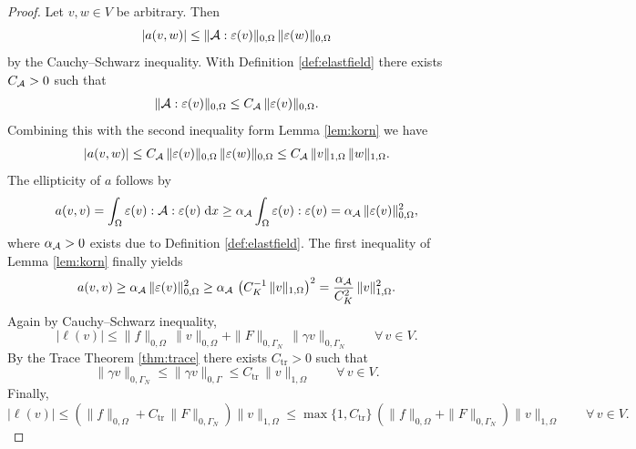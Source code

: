 \begin{proof}
	Let $v,w\in V$ be arbitrary. Then
	\begin{equation*}
		|a(v,w)|\le \|{\mathcal A}:\varepsilon(v)\|_{0,\Omega}\,\|\varepsilon(w)\|_{0,\Omega}
	\end{equation*}
	by the Cauchy--Schwarz inequality. With Definition \ref{def:elastfield} there exists $C_{\mathcal A}>0$ such that
	\begin{equation*}
		\|{\mathcal A}:\varepsilon(v)\|_{0,\Omega}\le C_{\mathcal A}\,\|\varepsilon(v)\|_{0,\Omega}.
	\end{equation*}
	Combining this with the second inequality form Lemma \ref{lem:korn} we have
	\begin{equation*}
		|a(v,w)|\le C_{\mathcal A}\,\|\varepsilon(v)\|_{0,\Omega}\,\|\varepsilon(w)\|_{0,\Omega}\le C_{\mathcal A}\,\|v\|_{1,\Omega}\,\|w\|_{1,\Omega}.
	\end{equation*}
	The ellipticity of $a$ follows by
	\begin{equation*}
		a(v,v) = \int_\Omega \varepsilon(v):{\mathcal A}:\varepsilon(v)\;{{\mathrm{d}} x} \ge \alpha_{\mathcal A}\int_\Omega\varepsilon(v):\varepsilon(v) = \alpha_{\mathcal A}\,\|\varepsilon(v)\|^2_{0,\Omega},
	\end{equation*}
	where $\alpha_{\mathcal A}>0$ exists due to Definition \ref{def:elastfield}. The first inequality of Lemma \ref{lem:korn} finally yields
	\begin{equation*}
		a(v,v)\ge \alpha_{\mathcal A}\,\|\varepsilon(v)\|_{0,\Omega}^2\ge \alpha_{\mathcal A}\,\left(C_K^{-1}\,\|v\|_{1,\Omega}\right)^2 = \frac{\alpha_{\mathcal A}}{C_K^2}\,\|v\|_{1,\Omega}^2.
	\end{equation*}
	Again by Cauchy--Schwarz inequality,
	\begin{equation*}
		|\ell(v)|\le \|f\|_{0,\Omega}\,\|v\|_{0,\Omega}+\|F\|_{0,\Gamma_N}\,\|\gamma v\|_{0,\Gamma_N}\qquad \forall\, v\in V.
	\end{equation*}
	By the Trace Theorem \ref{thm:trace} there exists $C_\mathrm{tr}>0$ such that
	\begin{equation*}
		\|\gamma v\|_{0,\Gamma_N}\le \|\gamma v\|_{0,\Gamma}\le C_\mathrm{tr}\,\|v\|_{1,\Omega} \qquad \forall\, v\in V.
	\end{equation*}
	Finally,
	\begin{equation*}
		|\ell(v)|\le \left(\|f\|_{0,\Omega} + C_{\mathrm{tr}}\,\|F\|_{0,\Gamma_N}\right)\|v\|_{1,\Omega}\le \max\{1,C_\mathrm{tr}\}\,\left(\|f\|_{0,\Omega}+\|F\|_{0,\Gamma_N}\right)\|v\|_{1,\Omega}\qquad \forall\, v\in V.
	\end{equation*}
\end{proof}

